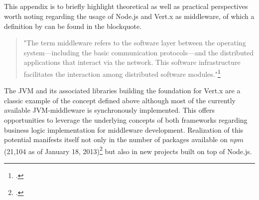 
\newpage \begin{appendices} 
\appendixtocon %

\appendixpage %

\subsection*{\listappendixname}
\listofappendices

\newpage

\begin{subappendices}
\renewcommand{\setthesubsection}{\arabic{subsection}:}%


\label{middleware}

This appendix is to briefly highlight theoretical as well as practical perspectives worth noting regarding the usage of Node.js and Vert.x as middleware, of which a definition by \citeauthor{Geihs_2001} can be found in the blockquote.

\begin{quotation}
"The term middleware refers to the software layer between the operating system—including the basic communication protocols—and the distributed applications that interact via the network. This software infrastructure facilitates the
interaction among distributed software modules."\footcite[][]{Geihs_2001}
\end{quotation}

The JVM and its associated libraries building the foundation for Vert.x are a classic example of the concept defined above although most of the currently available JVM-middleware is synchronously implemented. This offers opportunities to leverage the underlying concepts of both frameworks regarding business logic implementation for middleware development. Realization of this potential manifests itself not only in the number of packages available on $npm$ (21,104 as of January 18, 2013)\footcite[Cf.][]{node_packages} but also in new projects built on top of Node.js.\\


\end{subappendices}
\end{appendices}
